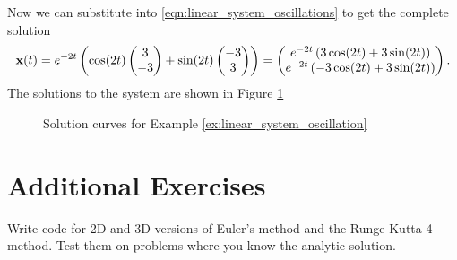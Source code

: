\begin{example}
    Now we can substitute into \eqref{eqn:linear_system_oscillations} to get the complete
    solution
    \[ {\bf x}(t) = e^{-2t} \left( \cos(2t) \begin{pmatrix} 3 \\ -3 \end{pmatrix} + \sin(2t)
    \begin{pmatrix} -3 \\ 3 \end{pmatrix} \right) = \begin{pmatrix} e^{-2t} \left( 3
        \cos(2t) + 3 \sin(2t)
    \right) \\ e^{-2t} \left( -3\cos(2t) + 3\sin(2t) \right) \end{pmatrix}. \]
    The solutions to the system are shown in Figure \ref{fig:linear_system_oscillation}
\end{example}

\begin{figure}
    \begin{center}
    \end{center}
    \caption{Solution curves for Example \ref{ex:linear_system_oscillation}}
    \label{fig:linear_system_oscillation}
\end{figure}


\section{Additional Exercises}
\begin{problem}
    Write code for 2D and 3D versions of Euler's method and the Runge-Kutta 4 method.
    Test them on problems where you know the analytic solution.
\end{problem}

